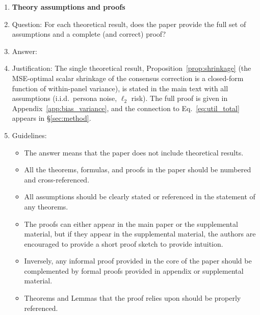 \begin{enumerate}
\begin{itemize}
        \item If applicable, the authors should discuss possible limitations of their approach to address problems of privacy and fairness.
        \item While the authors might fear that complete honesty about limitations might be used by reviewers as grounds for rejection, a worse outcome might be that reviewers discover limitations that aren't acknowledged in the paper. The authors should use their best judgment and recognize that individual actions in favor of transparency play an important role in developing norms that preserve the integrity of the community. Reviewers will be specifically instructed to not penalize honesty concerning limitations.
    \end{itemize}

\item {\bf Theory assumptions and proofs}
    \item[] Question: For each theoretical result, does the paper provide the full set of assumptions and a complete (and correct) proof?
    \item[] Answer: \answerYes{}
    \item[] Justification: The single theoretical result, Proposition~\ref{prop:shrinkage} (the MSE-optimal scalar shrinkage of the consensus correction is a closed-form function of within-panel variance), is stated in the main text with all assumptions (i.i.d.\ persona noise, $\ell_2$ risk). The full proof is given in Appendix~\ref{app:bias_variance}, and the connection to Eq.~\ref{eq:util_total} appears in \S\ref{sec:method}.
    \item[] Guidelines:
    \begin{itemize}
        \item The answer \answerNA{} means that the paper does not include theoretical results. 
        \item All the theorems, formulas, and proofs in the paper should be numbered and cross-referenced.
        \item All assumptions should be clearly stated or referenced in the statement of any theorems.
        \item The proofs can either appear in the main paper or the supplemental material, but if they appear in the supplemental material, the authors are encouraged to provide a short proof sketch to provide intuition. 
        \item Inversely, any informal proof provided in the core of the paper should be complemented by formal proofs provided in appendix or supplemental material.
        \item Theorems and Lemmas that the proof relies upon should be properly referenced. 
    \end{itemize}


\end{enumerate}
